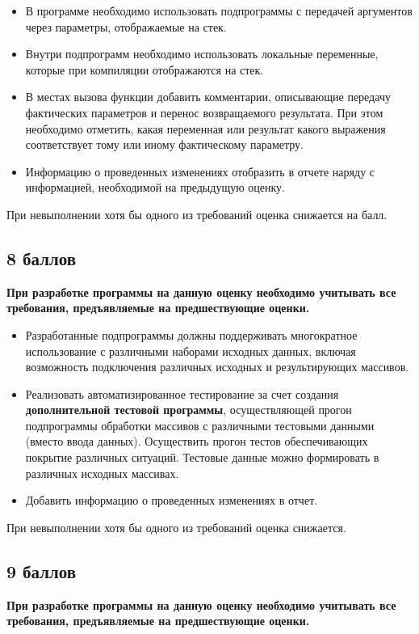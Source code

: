 \documentclass[a4paper, 12pt, oneside]{article}
\begin{document}
\begin{itemize}
    \item В программе необходимо использовать подпрограммы с передачей аргументов через параметры, отображаемые на стек.
    \item Внутри подпрограмм необходимо использовать локальные переменные, которые при компиляции отображаются на стек.
    \item В местах вызова функции добавить комментарии, описывающие передачу фактических параметров и перенос возвращаемого результата. При этом необходимо отметить, какая переменная или результат какого выражения соответствует тому или иному фактическому параметру.
    \item Информацию о проведенных изменениях отобразить в отчете наряду с информацией, необходимой на предыдущую оценку.
\end{itemize}
При невыполнении хотя бы одного из требований оценка снижается на балл.

\subsection*{8 баллов}

\textbf{При разработке программы на данную оценку необходимо учитывать все требования, предъявляемые на предшествующие оценки.}

\begin{itemize}
    \item Разработанные подпрограммы должны поддерживать многократное использование с различными наборами исходных данных, включая возможность подключения различных исходных и результирующих массивов.
    \item Реализовать автоматизированное тестирование за счет создания \textbf{дополнительной тестовой программы}, осуществляющей прогон подпрограммы обработки массивов с различными тестовыми данными (вместо ввода данных). Осуществить прогон тестов обеспечивающих покрытие различных ситуаций. Тестовые данные можно формировать в различных исходных массивах.
    \item Добавить информацию о проведенных изменениях в отчет.
\end{itemize}
При невыполнении хотя бы одного из требований оценка снижается.

\subsection*{9 баллов}

\textbf{При разработке программы на данную оценку необходимо учитывать все требования, предъявляемые на предшествующие оценки.}
\end{document}

